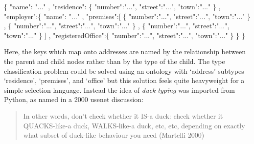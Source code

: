 \documentclass[12pt, ]{article}
\newenvironment{Shaded}{}{}
\newcommand{\StringTok}[1]{\textcolor[rgb]{0.25,0.44,0.63}{{#1}}}
\newcommand{\NormalTok}[1]{{#1}}
\begin{document}
\begin{Shaded}
\begin{Highlighting}[]
\NormalTok{\{}
   \StringTok{"name"}\NormalTok{: }\StringTok{"..."}
\NormalTok{,  }\StringTok{"residence"}\NormalTok{: \{}
      \StringTok{"number"}\NormalTok{:}\StringTok{"..."}\NormalTok{, }\StringTok{"street"}\NormalTok{:}\StringTok{"..."}\NormalTok{, }\StringTok{"town"}\NormalTok{:}\StringTok{"..."} 
   \NormalTok{\}}
\NormalTok{,  }\StringTok{"employer"}\NormalTok{:\{}
      \StringTok{"name"}\NormalTok{: }\StringTok{"..."}
   \NormalTok{,  }\StringTok{"premises"}\NormalTok{:[}
         \NormalTok{\{ }\StringTok{"number"}\NormalTok{:}\StringTok{"..."}\NormalTok{, }\StringTok{"street"}\NormalTok{:}\StringTok{"..."}\NormalTok{, }\StringTok{"town"}\NormalTok{:}\StringTok{"..."} \NormalTok{\}}
      \NormalTok{,  \{ }\StringTok{"number"}\NormalTok{:}\StringTok{"..."}\NormalTok{, }\StringTok{"street"}\NormalTok{:}\StringTok{"..."}\NormalTok{, }\StringTok{"town"}\NormalTok{:}\StringTok{"..."} \NormalTok{\}}
      \NormalTok{,  \{ }\StringTok{"number"}\NormalTok{:}\StringTok{"..."}\NormalTok{, }\StringTok{"street"}\NormalTok{:}\StringTok{"..."}\NormalTok{, }\StringTok{"town"}\NormalTok{:}\StringTok{"..."} \NormalTok{\}}
      \NormalTok{]}
   \NormalTok{,  }\StringTok{"registeredOffice"}\NormalTok{:\{}
         \StringTok{"number"}\NormalTok{:}\StringTok{"..."}\NormalTok{, }\StringTok{"street"}\NormalTok{:}\StringTok{"..."}\NormalTok{, }\StringTok{"town"}\NormalTok{:}\StringTok{"..."}
      \NormalTok{\}}
   \NormalTok{\}}
\NormalTok{\}  }
\end{Highlighting}
\end{Shaded}

Here, the keys which map onto addresses are named by the relationship
between the parent and child nodes rather than by the type of the child.
The type classification problem could be solved using an ontology with
`address' subtypes `residence', `premises', and `office' but this
solution feels quite heavyweight for a simple selection language.
Instead the idea of \emph{duck typing} was imported from Python, as
named in a 2000 usenet discussion:

\begin{quote}
In other words, don't check whether it IS-a duck: check whether it
QUACKS-like-a duck, WALKS-like-a duck, etc, etc, depending on exactly
what subset of duck-like behaviour you need (Martelli 2000)
\end{quote}
\end{document}
